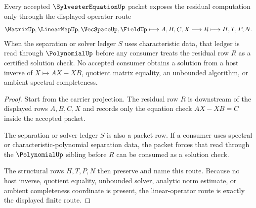 \begin{theorem}
\label{thm:sylvester-equation-linear-operator-route}
Every accepted $\SylvesterEquationUp$ packet exposes the residual computation only through the displayed operator route
$$
\MatrixUp,\LinearMapUp,\VecSpaceUp,\FieldUp \longmapsto A,B,C,X \longmapsto R \longmapsto H,T,P,N .
$$
When the separation or solver ledger $S$ uses characteristic data, that ledger is read through $\PolynomialUp$ before any consumer treats the residual row $R$ as a certified solution check. No accepted consumer obtains a solution from a host inverse of $X \mapsto AX-XB$, quotient matrix equality, an unbounded algorithm, or ambient spectral completeness.
\end{theorem}
\begin{proof}
Start from the carrier projection. The residual row $R$ is downstream of the displayed rows $A,B,C,X$ and records only the equation check $AX-XB=C$ inside the accepted packet.

The separation or solver ledger $S$ is also a packet row. If a consumer uses spectral or characteristic-polynomial separation data, the packet forces that read through the $\PolynomialUp$ sibling before $R$ can be consumed as a solution check.

The structural rows $H,T,P,N$ then preserve and name this route. Because no host inverse, quotient equality, unbounded solver, analytic norm estimate, or ambient completeness coordinate is present, the linear-operator route is exactly the displayed finite route.
\end{proof}




